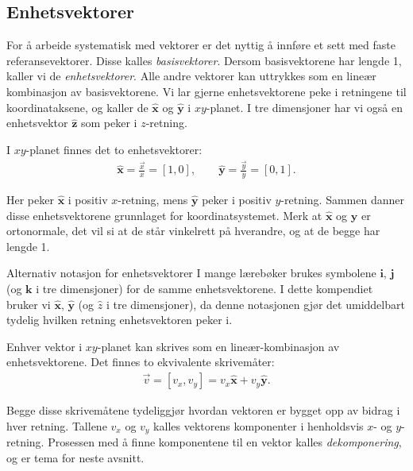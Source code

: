 
\subsection{Enhetsvektorer}

For å arbeide systematisk med vektorer er det nyttig å innføre et sett med faste referansevektorer. Disse kalles \emph{basisvektorer}. Dersom basisvektorene har lengde 1, kaller vi de \emph{enhetsvektorer}. Alle andre vektorer kan uttrykkes som en lineær kombinasjon av basisvektorene. Vi lar gjerne enhetsvektorene peke i retningene til koordinataksene, og kaller de $\hat{\mathbf{x}}$ og $\hat{\mathbf{y}}$ i $xy$-planet. I tre dimensjoner har vi også en enhetsvektor $\hat{\mathbf{z}}$ som peker i $z$-retning.


I $xy$-planet finnes det to enhetsvektorer:
\begin{align}
\hat{\mathbf{x}} = \frac{\vec{x}}{x}=[1,0], \qquad \hat{\mathbf{y}} = \frac{\vec{y}}{y}=[0,1].
\end{align}

Her peker $\hat{\mathbf{x}}$ i positiv $x$-retning, mens $\hat{\mathbf{y}}$ peker i positiv $y$-retning. Sammen danner disse enhetsvektorene grunnlaget for koordinatsystemet.
Merk at $\hat{\mathbf{x}}$ og $\hat{\mathbf{y}}$ er ortonormale, det vil si at de står vinkelrett på hverandre, og at de begge har lengde 1.
\begin{mymerk*}{Alternativ notasjon for enhetsvektorer}
I mange lærebøker brukes symbolene $\mathbf{i}$, $\mathbf{j}$ (og  $\mathbf{k}$ i tre dimensjoner) for de samme enhetsvektorene. I dette kompendiet bruker vi $\hat{\mathbf{x}}$, $\hat{\mathbf{y}}$ (og $\hat{z}$ i tre dimensjoner), da denne notasjonen gjør det umiddelbart tydelig hvilken retning enhetsvektoren peker i.
\end{mymerk*}

Enhver vektor i $xy$-planet kan skrives som en lineær-kombinasjon av enhetsvektorene. Det finnes to ekvivalente skrivemåter:
\begin{align}
\vec{v} = [v_x, v_y] = v_x \hat{\mathbf{x}} + v_y \hat{\mathbf{y}}.
\end{align}

Begge disse skrivemåtene tydeliggjør hvordan vektoren er bygget opp av bidrag i hver retning. Tallene $v_x$ og $v_y$ kalles vektorens komponenter i henholdsvis $x$- og $y$-retning. Prosessen med å finne komponentene til en vektor kalles \emph{dekomponering}, og er tema for neste avsnitt.

